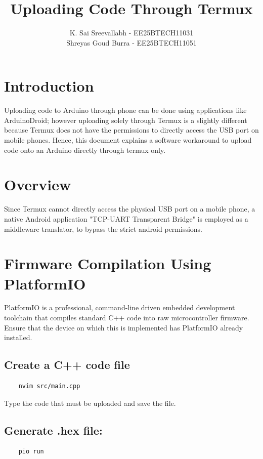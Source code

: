 \documentclass[conference]{IEEEtran} %
\title{\vspace{1cm}\textbf{Uploading Code Through Termux\\}}
\author{
K. Sai Sreevallabh - EE25BTECH11031\\
Shreyas Goud Burra - EE25BTECH11051
}
\date{}
\begin{document}
\maketitle

\tableofcontents

\section{Introduction}

Uploading code to Arduino through phone can be done using applications like ArduinoDroid; however uploading solely through Termux is a slightly different because Termux does not have the permissions to directly access the USB port on mobile phones. Hence, this document explains a software workaround to upload code onto an Arduino directly through termux only. 

\section{Overview}

Since Termux cannot directly access the physical USB port on a mobile phone, a native Android application "TCP-UART Transparent Bridge" is employed as a middleware translator, to bypass the strict android permissions. 


\section{Firmware Compilation Using PlatformIO}

PlatformIO is a professional, command-line driven embedded development toolchain that compiles standard C++ code into raw microcontroller firmware.
Ensure that the device on which this is implemented has PlatformIO already installed. 

\subsection{Create a C++ code file}
\begin{lstlisting}
    nvim src/main.cpp
\end{lstlisting}

Type the code that must be uploaded and save the file. \\

\subsection{Generate .hex file:}
\begin{lstlisting}
    pio run 
\end{lstlisting}
\end{document}
